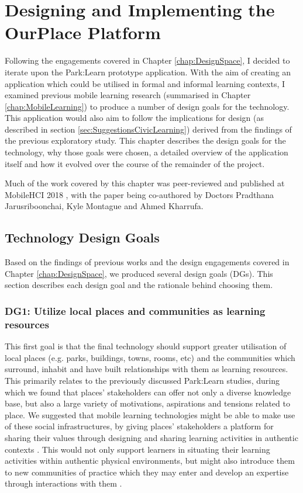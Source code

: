 \chapter{Designing and Implementing the OurPlace Platform}
\label{chap:Design}

Following the engagements covered in Chapter \ref{chap:DesignSpace}, I decided to iterate upon the Park:Learn prototype application. With the aim of creating an application which could be utilised in formal and informal learning contexts, I examined previous mobile learning research (summarised in Chapter \ref{chap:MobileLearning}) to produce a number of design goals for the technology. This application would also aim to follow the implications for design (as described in section \ref{sec:SuggestionsCivicLearning}) derived from the findings of the previous exploratory study. This chapter describes the design goals for the technology, why those goals were chosen, a detailed overview of the application itself and how it evolved over the course of the remainder of the project. 

Much of the work covered by this chapter was peer-reviewed and published at MobileHCI 2018 \citep{Richardson2018}, with the paper being co-authored by Doctors Pradthana Jarusriboonchai, Kyle Montague and Ahmed Kharrufa. 

\section{Technology Design Goals}
\label{sec:DesignGoals}
Based on the findings of previous works and the design engagements covered in Chapter \ref{chap:DesignSpace}, we produced several design goals (DGs). This section describes each design goal and the rationale behind choosing them.


\subsection*{ DG1: Utilize local places and communities as learning resources }
\label{DG1}

This first goal is that the final technology should support greater utilisation of local places (e.g. parks, buildings, towns, rooms, etc) and the communities which surround, inhabit and have built relationships with them as learning resources. This primarily relates to the previously discussed Park:Learn studies, during which we found that places' stakeholders can offer not only a diverse knowledge base, but also a large variety of motivations, aspirations and tensions related to place. We suggested that mobile learning technologies might be able to make use of these social infrastructures, by giving places’ stakeholders a platform for sharing their values through designing and sharing learning activities in authentic contexts \citep{Richardson2017}. This would not only support learners in situating their learning activities within authentic physical environments, but might also introduce them to new communities of practice which they may enter and develop an expertise through interactions with them \citep{lave1991situated}.

